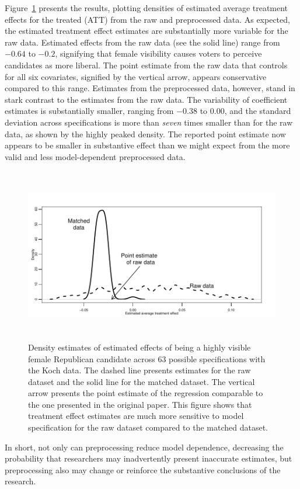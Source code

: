 \documentclass[11pt,titlepage]{article}
\begin{document}
Figure~\ref{fg:kochdens} presents the results, plotting densities of
estimated average treatment effects for the treated (ATT) from the raw
and preprocessed data.  As expected, the estimated treatment effect
estimates are substantially more variable for the raw data.  Estimated
effects from the raw data (see the solid line) range from $-0.64$ to
$-0.2$, signifying that female visibility causes voters to perceive
candidates as more liberal.  The point estimate from the raw data that
controls for all six covariates, signified by the vertical arrow,
appears conservative compared to this range.  Estimates from the
preprocessed data, however, stand in stark contrast to the estimates
from the raw data.  The variability of coefficient estimates is
substantially smaller, ranging from $-0.38$ to $0.00$, and the
standard deviation across specifications is more than \emph{seven}
times smaller than for the raw data, as shown by the highly peaked
density.  The reported point estimate now appears to be smaller in
substantive effect than we might expect from the more valid and less
model-dependent preprocessed data.
\begin{figure}[t] 
 \begin{center}
   \includegraphics[height=3in,angle=0]{figs/kochdens.pdf}
 \end{center} 
 \vspace{-0.275in}
 \caption{Density estimates of estimated effects of
   being a highly visible female Republican candidate across 63
   possible specifications with the Koch data.  The dashed line
   presents estimates for the raw dataset and the solid line for the
   matched dataset.  The vertical arrow presents the point estimate of
   the regression comparable to the one presented in the original
   paper.  This figure shows that treatment effect estimates are much
   more sensitive to model specification for the raw dataset compared
   to the matched dataset.}
 \label{fg:kochdens}
\end{figure}
In short, not only can preprocessing reduce model dependence,
decreasing the probability that researchers may inadvertently present
inaccurate estimates, but preprocessing also may change or reinforce
the substantive conclusions of the research.
\end{document}
